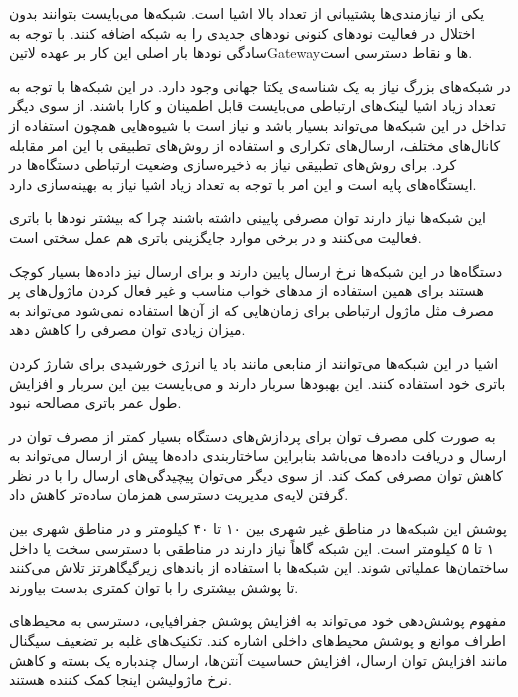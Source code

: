 
یکی از نیازمندی‌ها پشتیبانی از تعداد بالا اشیا است. شبکه‌ها می‌بایست بتوانند بدون اختلال در فعالیت نودهای کنونی نودهای جدیدی را به شبکه اضافه کنند.
با توجه به سادگی نودها بار اصلی این کار بر عهده ‌لاتین{Gateway}ها و نقاط دسترسی است.

در شبکه‌های بزرگ نیاز به یک شناسه‌ی یکتا جهانی وجود دارد.
در این شبکه‌ها با توجه به تعداد زیاد اشیا لینک‌های ارتباطی می‌بایست قابل اطمینان و کارا باشند.
از سوی دیگر تداخل در این شبکه‌ها می‌تواند بسیار باشد و نیاز است با شیوه‌هایی همچون استفاده از کانال‌های مختلف،
ارسال‌های تکراری و استفاده از روش‌های تطبیقی با این امر مقابله کرد.
برای روش‌های تطبیقی نیاز به ذخیره‌سازی وضعیت ارتباطی دستگاه‌ها در ایستگاه‌های پایه است و این امر با توجه به تعداد زیاد
اشیا نیاز به بهینه‌سازی دارد.


این شبکه‌ها نیاز دارند توان مصرفی پایینی داشته باشند چرا که بیشتر نودها با باتری فعالیت می‌کنند
و در برخی موارد جایگزینی باتری هم عمل سختی است.

دستگاه‌ها در این شبکه‌ها نرخ ارسال پایین دارند و برای ارسال نیز داده‌ها بسیار کوچک هستند
برای همین استفاده از مدهای خواب مناسب و غیر فعال کردن ماژول‌های پر مصرف مثل ماژول
ارتباطی برای زمان‌هایی که از آن‌ها استفاده نمی‌شود می‌تواند به میزان زیادی توان مصرفی را کاهش دهد.

اشیا در این شبکه‌ها می‌توانند از منابعی مانند باد یا انرژی خورشیدی برای شارژ کردن باتری خود استفاده کنند.
این بهبودها سربار دارند و می‌بایست بین این سربار و افزایش طول عمر باتری مصالحه نبود.

به صورت کلی مصرف توان برای پردازش‌های دستگاه بسیار کمتر از مصرف توان در ارسال و دریافت داده‌ها می‌باشد
بنابراین ساختاربندی داده‌ها پیش از ارسال می‌تواند به کاهش توان مصرفی کمک کند. از سوی دیگر می‌توان پیچیدگی‌های
ارسال را با در نظر گرفتن لایه‌ی مدیریت دسترسی همزمان ساده‌تر کاهش داد.


پوشش این شبکه‌ها در مناطق غیر شهری بین ۱۰ تا ۴۰ کیلومتر و
در مناطق شهری بین ۱ تا ۵ کیلومتر است.
این شبکه گاهاً نیاز دارند در مناطقی با دسترسی سخت یا داخل ساختمان‌ها
عملیاتی شوند. این شبکه‌ها با استفاده از باندهای زیرگیگاهرتز تلاش می‌کنند تا پوشش بیشتری را با توان کمتری بدست بیاورند.

مفهوم پوشش‌دهی خود می‌تواند به افزایش پوشش جفرافیایی، دسترسی به محیط‌های اطراف موانع و پوشش محیط‌های داخلی اشاره کند.
تکنیک‌های غلبه بر تضعیف سیگنال مانند افزایش توان ارسال، افزایش حساسیت آنتن‌ها، ارسال چندباره یک بسته و کاهش نرخ ماژولیشن اینجا کمک کننده هستند.

